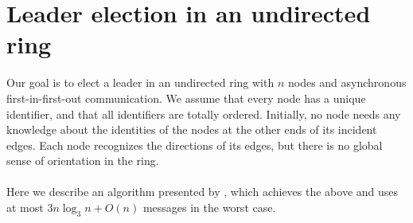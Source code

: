 \documentclass{article}
\begin{document}
\section*{Leader election in an undirected ring}
Our goal is to elect a leader in an undirected ring with $n$ nodes and asynchronous first-in-first-out communication.  We assume that every node has a unique identifier, and that all identifiers are
totally ordered. Initially, no node needs any knowledge about the identities of the nodes at the
other ends of its incident edges. Each node recognizes the directions of its edges, but there is no global sense of orientation in the ring. 
\paragraph{}
Here we describe an algorithm presented by \cite{ROTEM1987575}, which achieves the above and uses at most $3 n\log_{3}n + O(n)$ messages in the worst case.
\end{document}
